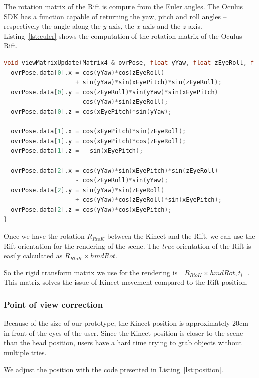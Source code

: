 \documentclass[12pt]{article}
\begin{document}
The rotation matrix of the Rift is compute from the Euler angles. The Oculus SDK has a function capable of returning the yaw, pitch and roll angles -- respectively the angle along the $y$-axis, the $x$-axis and the $z$-axis. Listing~\ref{lst:euler} shows the computation of the rotation matrix of the Oculus Rift.

\begin{lstlisting}[language=C++, caption={C++ code for computing the rotation matrix of the Rift}, label={lst:euler}]
void viewMatrixUpdate(Matrix4 & ovrPose, float yYaw, float zEyeRoll, float xEyePitch){
  ovrPose.data[0].x = cos(yYaw)*cos(zEyeRoll)
                    + sin(yYaw)*sin(xEyePitch)*sin(zEyeRoll);
  ovrPose.data[0].y = cos(zEyeRoll)*sin(yYaw)*sin(xEyePitch)
                    - cos(yYaw)*sin(zEyeRoll);
  ovrPose.data[0].z = cos(xEyePitch)*sin(yYaw);
        
  ovrPose.data[1].x = cos(xEyePitch)*sin(zEyeRoll);
  ovrPose.data[1].y = cos(xEyePitch)*cos(zEyeRoll);
  ovrPose.data[1].z = - sin(xEyePitch);
        
  ovrPose.data[2].x = cos(yYaw)*sin(xEyePitch)*sin(zEyeRoll)
                    - cos(zEyeRoll)*sin(yYaw);
  ovrPose.data[2].y = sin(yYaw)*sin(zEyeRoll)
                    + cos(yYaw)*cos(zEyeRoll)*sin(xEyePitch);
  ovrPose.data[2].z = cos(yYaw)*cos(xEyePitch);
}
\end{lstlisting}

Once we have the rotation $R_{RtoK}$ between the Kinect and the Rift, we can use the Rift orientation for the rendering of the scene. The \textit{true} orientation of the Rift is easily calculated as $R_{RtoK}\times hmdRot$.

So the rigid transform matrix we use for the rendering is $[R_{RtoK}\times hmdRot,t_i]$. This matrix solves the issue of Kinect movement compared to the Rift position.

\subsubsection{Point of view correction}

Because of the size of our prototype, the Kinect position is approximately 20cm in front of the eyes of the user. Since the Kinect position is closer to the scene than the head position, users have a hard time trying to grab objects without multiple tries.

We adjust the position with the code presented in Listing~\ref{lst:position}.
\end{document}
